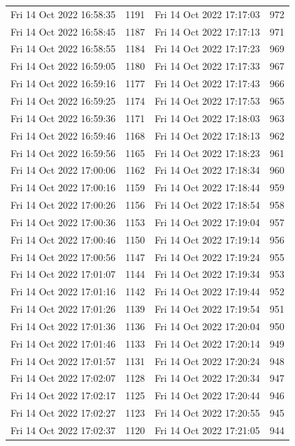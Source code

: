 \documentclass[12pt]{ctexart}
\numberwithin{equation}{section}
\begin{document}
\begin{longtable}{cc|cc}
Fri 14 Oct 2022 16:58:35 & 1191 & Fri 14 Oct 2022 17:17:03 & 972 \\
Fri 14 Oct 2022 16:58:45 & 1187 & Fri 14 Oct 2022 17:17:13 & 971 \\
Fri 14 Oct 2022 16:58:55 & 1184 & Fri 14 Oct 2022 17:17:23 & 969 \\
Fri 14 Oct 2022 16:59:05 & 1180 & Fri 14 Oct 2022 17:17:33 & 967 \\
Fri 14 Oct 2022 16:59:16 & 1177 & Fri 14 Oct 2022 17:17:43 & 966 \\
Fri 14 Oct 2022 16:59:25 & 1174 & Fri 14 Oct 2022 17:17:53 & 965 \\
Fri 14 Oct 2022 16:59:36 & 1171 & Fri 14 Oct 2022 17:18:03 & 963 \\
Fri 14 Oct 2022 16:59:46 & 1168 & Fri 14 Oct 2022 17:18:13 & 962 \\
Fri 14 Oct 2022 16:59:56 & 1165 & Fri 14 Oct 2022 17:18:23 & 961 \\
Fri 14 Oct 2022 17:00:06 & 1162 & Fri 14 Oct 2022 17:18:34 & 960 \\
Fri 14 Oct 2022 17:00:16 & 1159 & Fri 14 Oct 2022 17:18:44 & 959 \\
Fri 14 Oct 2022 17:00:26 & 1156 & Fri 14 Oct 2022 17:18:54 & 958 \\
Fri 14 Oct 2022 17:00:36 & 1153 & Fri 14 Oct 2022 17:19:04 & 957 \\
Fri 14 Oct 2022 17:00:46 & 1150 & Fri 14 Oct 2022 17:19:14 & 956 \\
Fri 14 Oct 2022 17:00:56 & 1147 & Fri 14 Oct 2022 17:19:24 & 955 \\
Fri 14 Oct 2022 17:01:07 & 1144 & Fri 14 Oct 2022 17:19:34 & 953 \\
Fri 14 Oct 2022 17:01:16 & 1142 & Fri 14 Oct 2022 17:19:44 & 952 \\
Fri 14 Oct 2022 17:01:26 & 1139 & Fri 14 Oct 2022 17:19:54 & 951 \\
Fri 14 Oct 2022 17:01:36 & 1136 & Fri 14 Oct 2022 17:20:04 & 950 \\
Fri 14 Oct 2022 17:01:46 & 1133 & Fri 14 Oct 2022 17:20:14 & 949 \\
Fri 14 Oct 2022 17:01:57 & 1131 & Fri 14 Oct 2022 17:20:24 & 948 \\
Fri 14 Oct 2022 17:02:07 & 1128 & Fri 14 Oct 2022 17:20:34 & 947 \\
Fri 14 Oct 2022 17:02:17 & 1125 & Fri 14 Oct 2022 17:20:44 & 946 \\
Fri 14 Oct 2022 17:02:27 & 1123 & Fri 14 Oct 2022 17:20:55 & 945 \\
Fri 14 Oct 2022 17:02:37 & 1120 & Fri 14 Oct 2022 17:21:05 & 944 \\

\end{longtable}
\end{document}
